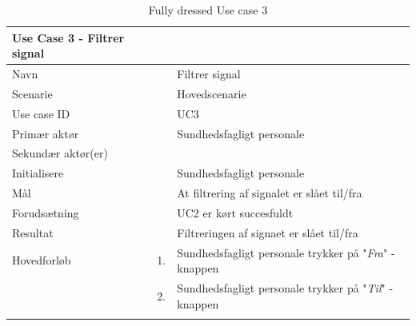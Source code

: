 \begin{longtabu} to 
\toprule
    {\large \textbf{Use Case 3 - Filtrer signal}} && \\
    \toprule
    Navn &&    Filtrer signal\\
    Scenarie &&    Hovedscenarie\\
    Use case ID &&    UC3\\
    Primær aktør &&    Sundhedsfagligt personale\\
    Sekundær aktør(er) &&    \\
    Initialisere &&    Sundhedsfagligt personale\\
    Mål &&    At filtrering af signalet er slået til/fra \\
    Forudsætning	&&	UC2 er kørt succesfuldt\\
    Resultat &&    Filtreringen af signaet er slået til/fra\\
    \toprule
    Hovedforløb &    1. &    Sundhedsfagligt personale trykker på "\textit{Fra}"\- -knappen\\[-1ex]
                &    2. &    Sundhedsfagligt personale trykker på "\textit{Til}"\- -knappen\\[-1ex]
                             \toprule
\caption{Fully dressed Use case 3}
\label{UC3}
\end{longtabu}
\newpage

